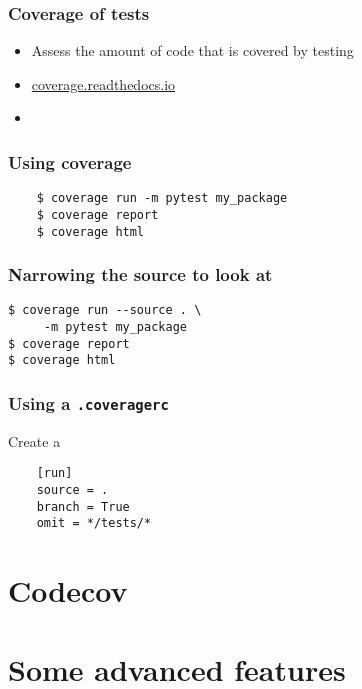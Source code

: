 \documentclass[14pt,compress]{beamer}
\begin{document}
\begin{frame}
  \frametitle{Coverage of tests}
  \begin{itemize}
    \item Assess the amount of code that is covered by testing
    \item \url{coverage.readthedocs.io}
    \item {}
  \end{itemize}
\end{frame}

\begin{frame}[fragile]
  \frametitle{Using coverage}
  \begin{lstlisting}
    $ coverage run -m pytest my_package
    $ coverage report
    $ coverage html
  \end{lstlisting}%
\end{frame}

\begin{frame}[fragile]
  \frametitle{Narrowing the source to look at}
  \begin{lstlisting}
$ coverage run --source . \
     -m pytest my_package
$ coverage report
$ coverage html
  \end{lstlisting}%
\end{frame}

\begin{frame}[fragile]
  \frametitle{Using a \texttt{.coveragerc}}
  Create a 
  \begin{lstlisting}
    [run]
    source = .
    branch = True
    omit = */tests/*
  \end{lstlisting}
\end{frame}


\section{Codecov}


\section{Some advanced features}
\end{document}
